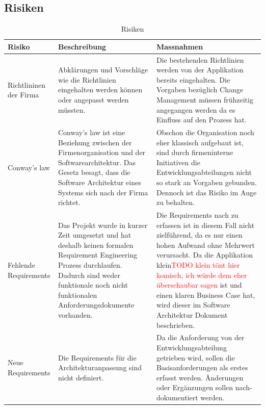 \begin{landscape}
\section{Risiken}
\begin{table}[h!]
	\centering
	\caption{Risiken}
	\begin{tabular}{ | p{2cm} | p{10cm} | p{10cm} | }
		\toprule
		{\textbf{Risiko}} & {\textbf{Beschreibung}} & {\textbf{Massnahmen}} \\
		\midrule
		Richtlininen der Firma & Abklärungen und Vorschläge wie die Richtlinien eingehalten werden können oder angepasst werden müssten. & Die bestehenden Richtlinien werden von der Applikation bereits eingehalten. Die Vorgaben bezüglich Change Management müssen frühzeitig angegangen werden da es Einfluss auf den Prozess hat. \\ \hline
		Conway's law & Conway's law ist eine Beziehung zwischen der Firmenorganisation und der Softwarearchitektur. Das Gesetz besagt, dass die Software Architektur eines Systems sich nach der Firma richtet. & Obschon die Organisation noch eher klassisch aufgebaut ist, sind durch firmeninterne Initiativen die Entwicklungsabteilungen nicht so stark an Vorgaben gebunden. Dennoch ist das Risiko im Auge zu behalten. \\ \hline
		Fehlende Requirements & Das Projekt wurde in kurzer Zeit umgesetzt und hat deshalb keinen formalen Requirement Engineering Prozess durchlaufen. Dadurch sind weder funktionale noch nicht funktionalen Anforderungsdokumente vorhanden. & Die Requirements nach zu erfassen ist in diesem Fall nicht zielführend, da es nur einen hohen Aufwand ohne Mehrwert verursacht. Da die Applikation klein\textcolor{red}{TODO klein tönt hier komisch, ich würde dem eher überschaubar sagen} ist und einen klaren Business Case hat,  wird dieser im Software Architektur Dokument beschrieben.\\ \hline
		Neue Requirements & Die Requirements für die Architekturanpassung sind nicht definiert. & Da die Anforderung von der Entwicklungsabteilung getrieben wird, sollen die Basisanforderungen als erstes erfasst werden. Änderungen oder Ergänzungen sollen nach-dokumentiert werden.\\
		\bottomrule
	\end{tabular}
\end{table}

\end{landscape}
\restoregeometry
